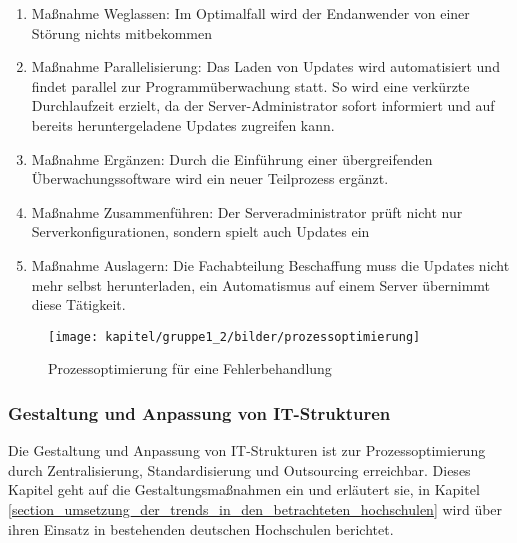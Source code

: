 \begin{enumerate}
	\item Maßnahme Weglassen: Im Optimalfall wird der Endanwender von einer Störung nichts mitbekommen
	\item Maßnahme Parallelisierung: Das Laden von Updates wird automatisiert und findet parallel zur Programmüberwachung statt. So wird eine verkürzte Durchlaufzeit erzielt, da der Server-Administrator sofort informiert und auf bereits heruntergeladene Updates zugreifen kann.
	\item Maßnahme Ergänzen: Durch die Einführung einer übergreifenden Überwachungssoftware wird ein neuer Teilprozess ergänzt.
	\item Maßnahme Zusammenführen: Der Serveradministrator prüft nicht nur Serverkonfigurationen, sondern spielt auch Updates ein
	\item Maßnahme Auslagern: Die Fachabteilung Beschaffung muss die Updates nicht mehr selbst herunterladen, ein Automatismus auf einem Server übernimmt diese Tätigkeit.
\end{enumerate}


\begin{figure}[h]
	\centering
	\texttt{[image: kapitel/gruppe1\_2/bilder/prozessoptimierung]} 
	\caption{Prozessoptimierung für eine Fehlerbehandlung}
	\label{fig_prozessoptimierung}
\end{figure}
\clearpage

\subsubsection{Gestaltung und Anpassung von IT-Strukturen}
\label{subsubsection_gestaltung_IT_strukturen}
Die Gestaltung und Anpassung von IT-Strukturen ist zur Prozessoptimierung durch Zentralisierung, Standardisierung und Outsourcing erreichbar. Dieses Kapitel geht auf die Gestaltungsmaßnahmen ein und erläutert sie, in Kapitel \ref{section_umsetzung_der_trends_in_den_betrachteten_hochschulen} wird über ihren Einsatz in bestehenden deutschen Hochschulen berichtet.


